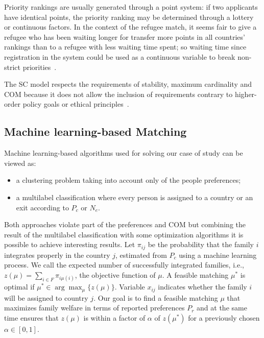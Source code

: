 Priority rankings are usually generated through a point system: if two applicants have identical points, the priority ranking may be determined through a lottery or continuous factors.
In the context  of the refugee match, it seems fair to give a refugee who has been waiting longer for transfer  more points in all countries’ rankings than to a refugee with less waiting time spent;
so waiting time since registration in the system could be used as a continuous variable to break non-strict priorities~\cite{basshuysen}.

The SC model respects the requirements of stability, maximum cardinality and COM because it does not allow the inclusion of requirements contrary to higher-order policy goals or ethical principles~\cite{basshuysen}.


\subsection{Machine learning-based Matching}\label{machine-learning-based-matching}%
Machine learning-based algorithms used for solving our case of study can be viewed as:
\begin{itemize}
    \item a clustering problem taking into account only of the people preferences;
    \item a multilabel classification where every person is assigned to a country or an exit according to \(P_c\) or \(N_e\).
\end{itemize}
Both approaches violate part of the preferences and COM but combining the result of the multilabel classification with some optimization algorithms it is possible to achieve interesting results.
Let \(\pi_{ij}\) be the probability that the family \(i\) integrates properly in the country \(j\), estimated from \(P_c\) using a machine learning process.
We call the expected number of successfully integrated families, i.e., \(z (\mu) = \sum_{i \in F} \pi_{i \mu (i)}\), the objective function of \(\mu\). A feasible matching \(\mu^*\) is optimal if \(\mu^* \in \arg\max_{\mu} \{z (\mu)\}\).
Variable \(x_{ij}\) indicates whether the family \(i\) will be assigned to country \(j\).
Our goal is to find a feasible matching \(\mu\) that maximizes family welfare in terms of reported preferences \(P_r\) and at the same time ensures that \(z (\mu)\) is within a factor of \(\alpha\) of \(z \left( \mu^* \right) \) for a previously chosen \(\alpha \in [0,1]\).

